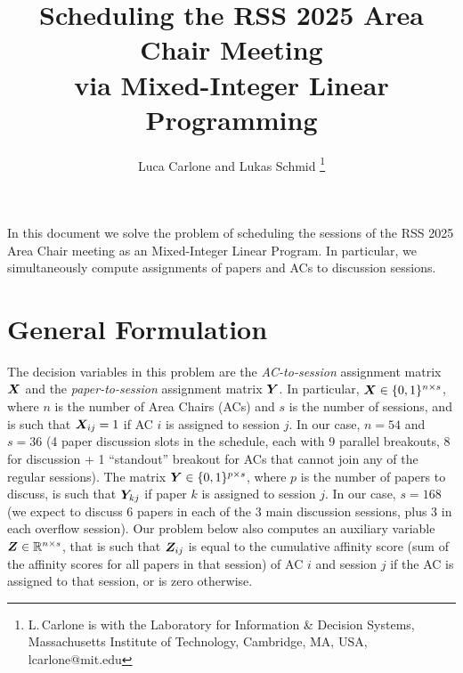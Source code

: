 \documentclass[journal, onecolumn]{IEEEtran}
\begin{document}
 \title{\LARGE{Scheduling the RSS 2025 Area Chair Meeting \\ via Mixed-Integer Linear Programming}}

\author{Luca Carlone and Lukas Schmid
\thanks{L.\,Carlone is with the Laboratory for Information \& Decision Systems, Massachusetts Institute of Technology, Cambridge, MA, USA, 
{\sf lcarlone@mit.edu}
}}

\newcommand{\MRij}{\bar\MR\ij}
\newcommand{\MRijy}{\bar\MR_{ij,y}}
\newcommand{\MRiy}{\MR_{y}(\theta_i) }
\newcommand{\MRip}{\bar\MR_{i,p}}
\newcommand{\MRir}{\bar\MR_{i,r}}
\newcommand{\MRjy}{\MR_{y}(\theta_j) }
\newcommand{\MRjp}{\bar\MR_{j,p}}
\newcommand{\MRjr}{\bar\MR_{j,r}}
\newcommand{\vtij}{\bar\vt\ij}
\newcommand{\vtijy}{\bar\vt_{ij,y}}
\newcommand{\Log}[1]{\text{Log}\left(#1\right)}

\maketitle

In this document we solve the problem of scheduling the sessions of the RSS 2025 Area Chair meeting as an Mixed-Integer Linear Program.
In particular, we simultaneously compute assignments of papers and ACs to discussion sessions.

\section{General Formulation}

The decision variables in this problem are the \emph{AC-to-session} assignment matrix ${\bm X}$ and 
the \emph{paper-to-session} assignment matrix ${\bm Y}$.  
In particular, ${\bm X} \in \{0,1\}^{n \times s}$, where $n$ is the number of Area Chairs (ACs) and $s$ is the number of sessions, and is such that ${\bm X}_{ij} = 1$ if AC $i$ is assigned to session $j$.
In our case, $n = 54$ and $s = 36$ (4 paper discussion slots in the schedule, each with 9 parallel breakouts, 8 for discussion + 1 ``standout'' breakout for ACs that cannot join any of the regular sessions).
%
The matrix ${\bm Y} \in \{0,1\}^{p \times s}$, where $p$ is the number of papers to discuss, is such that ${\bm Y}_{kj}$ if paper $k$ is assigned to session $j$.
In our case, $s = 168$ (\ie we expect to discuss 6 papers in each of the 3 main discussion sessions, plus 3 in each overflow session).  
Our problem below also computes an auxiliary variable ${\bm Z} \in { {\mathbb R}^{n \times s} }$, that is such that ${\bm Z}_{ij}$ is equal to the cumulative affinity score (sum of the affinity scores for all papers in that session) of AC $i$ and session $j$ if the AC is assigned to that session, or is zero otherwise.
\end{document}
